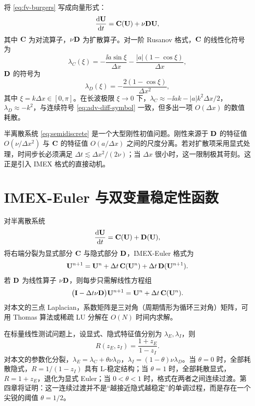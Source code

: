 将 \eqref{eq:fv-burgers} 写成向量形式：
\begin{equation}
  \frac{\mathrm{d} {\mathbf{U}}}{\mathrm{d} t}={\mathbf{C}}({\mathbf{U}})+\nu{\mathbf{D}}{\mathbf{U}},
  \label{eq:semidiscrete}
\end{equation}
其中 ${\mathbf{C}}$ 为对流算子，$\nu{\mathbf{D}}$ 为扩散算子。对一阶 Rusanov 格式，${\mathbf{C}}$ 的线性化符号为
\begin{equation}
  \lambda_C(\xi)=-\frac{\ii a\sin\xi}{\Delta x}
  -\frac{|a|(1-\cos\xi)}{\Delta x},
  \label{eq:lambda-C}
\end{equation}
${\mathbf{D}}$ 的符号为
\begin{equation}
  \lambda_D(\xi)=-\frac{2(1-\cos\xi)}{\Delta x^2},
  \label{eq:lambda-D}
\end{equation}
其中 $\xi=k\Delta x\in[0,\pi]$。在长波极限 $\xi\to0$ 下，$\lambda_C\approx-\ii ak-|a|k^2\Delta x/2$，$\lambda_D\approx-k^2$，与连续符号 \eqref{eq:adv-diff-symbol} 一致，但多出一项 $O(\Delta x)$ 的数值耗散。

半离散系统 \eqref{eq:semidiscrete} 是一个大型刚性初值问题。刚性来源于 ${\mathbf{D}}$ 的特征值 $O(\nu/\Delta x^2)$ 与 ${\mathbf{C}}$ 的特征值 $O(a/\Delta x)$ 之间的尺度分离。若对扩散项采用显式处理，时间步长必须满足 $\Delta t\lesssim\Delta x^2/(2\nu)$；当 $\Delta x$ 很小时，这一限制极其苛刻。这正是引入 IMEX 格式的直接动机。

\section{IMEX-Euler 与双变量稳定性函数}
\label{sec:imex-basic}

对半离散系统
\begin{equation}
  \frac{\mathrm{d} {\mathbf{U}}}{\mathrm{d} t}={\mathbf{C}}({\mathbf{U}})+{\mathbf{D}}({\mathbf{U}}),
\end{equation}
将右端分裂为显式部分 ${\mathbf{C}}$ 与隐式部分 ${\mathbf{D}}$，IMEX-Euler 格式为
\begin{equation}
  {\mathbf{U}}^{n+1}={\mathbf{U}}^n+\Delta t\,{\mathbf{C}}({\mathbf{U}}^n)+\Delta t\,{\mathbf{D}}({\mathbf{U}}^{n+1}).
  \label{eq:imex-euler-general}
\end{equation}
若 ${\mathbf{D}}$ 为线性算子 $\nu{\mathbf{D}}$，则每步只需解线性方程组
\begin{equation}
  \bigl({\mathbf{I}}-\Delta t\nu{\mathbf{D}}\bigr){\mathbf{U}}^{n+1}
  ={\mathbf{U}}^n+\Delta t\,{\mathbf{C}}({\mathbf{U}}^n).
  \label{eq:imex-linear-solve}
\end{equation}
对本文的三点 Laplacian，系数矩阵是三对角（周期情形为循环三对角）矩阵，可用 Thomas 算法或稀疏 LU 分解在 $O(N)$ 时间内求解。

在标量线性测试问题上，设显式、隐式特征值分别为 $\lambda_E,\lambda_I$，则
\begin{equation}
  R(z_E,z_I)=\frac{1+z_E}{1-z_I}.
\end{equation}
对本文的参数化分裂，$\lambda_E=\lambda_C+\theta\nu\lambda_D$，$\lambda_I=(1-\theta)\nu\lambda_D$。当 $\theta=0$ 时，全部耗散隐式，$R=1/(1-z_I)$ 具有 L-稳定结构；当 $\theta=1$ 时，全部耗散显式，$R=1+z_E$，退化为显式 Euler；当 $0<\theta<1$ 时，格式在两者之间连续过渡。第四章将证明：这一连续过渡并不是“越接近隐式越稳定”的单调过程，而是存在一个尖锐的阈值 $\theta=1/2$。

